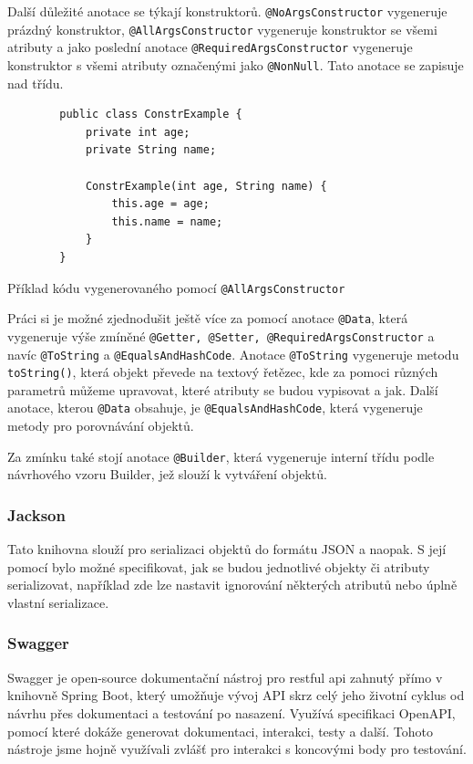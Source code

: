 Další důležité anotace se týkají konstruktorů. \texttt{@NoArgsConstructor} vygeneruje prázdný konstruktor, \texttt{@AllArgsConstructor} vygeneruje konstruktor se všemi atributy  a jako poslední anotace \texttt{@RequiredArgsConstructor} vygeneruje konstruktor s všemi atributy označenými jako \texttt{@NonNull}. Tato anotace se zapisuje nad třídu. \cite{lombok:constructor}

\begin{listing}[H]
    \begin{verbatim}
        public class ConstrExample {
            private int age;
            private String name;

            ConstrExample(int age, String name) {
                this.age = age;
                this.name = name;
            }
        }
    \end{verbatim}
    \caption{Příklad kódu vygenerovaného pomocí \texttt{@AllArgsConstructor}}
    \label{code:lombok:constructor}
\end{listing}


Práci si je možné zjednodušit ještě více za pomocí anotace \texttt{@Data}, která vygeneruje výše zmíněné \texttt{@Getter, @Setter, @RequiredArgsConstructor} a navíc \texttt{@ToString} a \texttt{@EqualsAndHashCode}.\cite{lombok:data} Anotace \texttt{@ToString} vygeneruje metodu \texttt{toString()}, která objekt převede na textový řetězec, kde za pomoci různých parametrů můžeme upravovat, které atributy se budou vypisovat a jak. Další anotace, kterou \texttt{@Data} obsahuje, je \texttt{@EqualsAndHashCode}, která vygeneruje metody pro porovnávání objektů.

Za zmínku také stojí anotace \texttt{@Builder}, která vygeneruje interní třídu podle návrhového vzoru Builder\cite{refactoringGuru:builder}, jež slouží k vytváření objektů. \cite{lombok:builder}

\subsubsection*{Jackson}\label{sec:impl:jackson}
Tato knihovna slouží pro serializaci objektů do formátu JSON  a naopak. S její pomocí bylo možné specifikovat, jak se budou jednotlivé objekty či atributy serializovat, například zde lze nastavit ignorování některých atributů nebo úplně vlastní serializace.

\subsubsection*{Swagger}\label{sec:impl:swagger}
Swagger je open-source dokumentační nástroj pro \gls{restful api} zahnutý přímo v knihovně Spring Boot, který umožňuje vývoj API skrz celý jeho životní cyklus od návrhu přes dokumentaci a testování po nasazení. Využívá specifikaci OpenAPI, pomocí které dokáže generovat dokumentaci, interakci, testy a další.\cite{swagger:about} Tohoto nástroje jsme hojně využívali zvlášť pro interakci s koncovými body pro testování.

